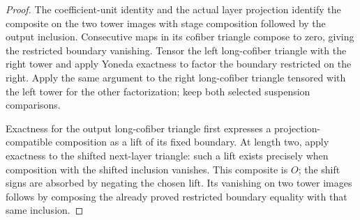 \begin{proof}
  \leanok
  The coefficient-unit identity and the actual layer projection identify
  the composite on the two tower images with stage composition followed by
  the output inclusion.  Consecutive maps in its cofiber triangle compose
  to zero, giving the restricted boundary vanishing.  Tensor the left
  long-cofiber triangle with the right tower and apply Yoneda exactness to
  factor the boundary restricted on the right.  Apply the same argument
  to the right long-cofiber triangle tensored with the left tower for the
  other factorization; keep both selected suspension comparisons.

  Exactness for the output long-cofiber triangle first expresses a
  projection-compatible composition as a lift of its fixed boundary.
  At length two, apply exactness to the shifted next-layer triangle:
  such a lift exists precisely when composition with the shifted inclusion
  vanishes.  This composite is $O$; the shift signs are absorbed by negating
  the chosen lift.  Its vanishing on two tower images follows by composing
  the already proved restricted boundary equality with that same inclusion.
\end{proof}

